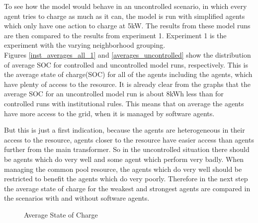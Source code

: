 \documentclass[a4paper]{article}
\begin{document}
To see how the model would behave in an uncontrolled scenario, in which every agent tries to charge as much as it can, the model 
is run with simplified agents which only have one action to charge at 5kW. The results from these model runs are then compared to the 
results from experiment 1. Experiment 1 is the experiment with the varying neighborhood grouping.\\
Figures \ref{inst_averages_all_1} and \ref{averages_uncontrolled} show the distribution of 
average SOC for controlled and uncontrolled model runs, respectively. 
This is the average state of charge(SOC) for all of the agents including the agents, which have plenty of access to the resource. 
It is already clear from the graphs that the average 
SOC for an uncontrolled model run is about 8kWh less than for controlled runs with institutional rules. This means that on average 
the agents have more access to the grid, when it is managed by software agents. 

But this is just a first indication,
because the agents are heterogeneous in their access to the resource, agents closer to the resource have easier access than agents
further from the main transformer. So in the uncontrolled situation there should be agents which do very well and some agent which  
perform very badly. When managing the common pool resource, the agents which do very well should be restricted to benefit the agents 
which do very poorly. Therefore in the next step the average state of charge for the weakest and strongest agents are compared in the 
scenarios with and without software agents.\\
\newpage
\begin{figure}[!ht]
\caption{Average State of Charge}
\label{averages_unconstrained_a}
\end{figure}
\end{document}
